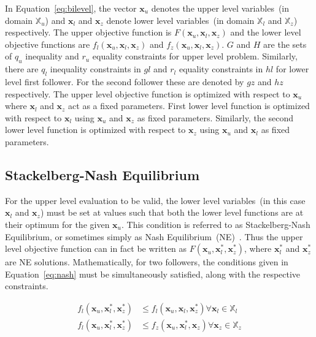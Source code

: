 In Equation~\ref{eq:bilevel}, the vector $\mathbf{x}_u$ denotes the upper level variables~(in domain
$\mathbb{X}_u$) and $\mathbf{x}_l$ and $\mathbf{x}_z$ denote lower level variables~(in domain
$\mathbb{X}_l$ and $\mathbb{X}_z$) respectively. The upper objective function is $F(\mathbf{x}_u, \mathbf{ x}_l, \mathbf{ x}_z)$ and the lower level objective functions are $f_l(\mathbf{x}_u, \mathbf{ x}_l, \mathbf{ x}_z)$ and
$f_z(\mathbf{x}_u, \mathbf{ x}_l, \mathbf{ x}_z)$. $G$ and $H$ are the sets of $q_u$ inequality and $r_u$ equality
constraints for upper level problem. Similarly, there are $q_l$ inequality constraints in $gl$ and
$r_l$ equality constraints in $hl$ for lower level first follower. For the second follower these are
denoted by $gz$ and $hz$ respectively. The upper level objective function is optimized with respect
to $\mathbf{x}_u$ where $\mathbf{x}_l$ and $\mathbf{x}_z$ act as a fixed parameters. First
lower level function is optimized with respect to $\mathbf{x}_l$ using $\mathbf{x}_u$ and
$\mathbf{x}_z$ as fixed parameters. Similarly, the second lower level function is optimized with
respect to $\mathbf{x}_z$ using $\mathbf{x}_u$ and $\mathbf{x}_l$ as fixed parameters.

\subsection*{Stackelberg-Nash Equilibrium}

For the upper level evaluation to be valid, the lower level variables~(in this case $\mathbf{x}_l$
and $\mathbf{x}_z$) must be set at values such that both the lower level functions are at their
optimum for the given $\mathbf{x}_u$. This condition is referred to as Stackelberg-Nash Equilibrium,
or sometimes simply as Nash Equilibrium~(NE)~\cite{nash1951non,angelo2015}. Thus the upper level
objective function can in fact be written as $F(\mathbf{x}_u, \mathbf{ x}^*_l, \mathbf{ x}^*_z)$, where $\mathbf{x}^*_l$
and $\mathbf{x}_z^*$ are NE solutions. Mathematically, for two followers, the conditions given in
Equation~\ref{eq:nash} must be simultaneously satisfied, along with the respective constraints.

\begin{equation} \begin{aligned} f_l(\mathbf{x}_u, \mathbf{ x}^*_l, \mathbf{ x}^*_z) & \leq f_l(\mathbf{x}_u, \mathbf{ x}_l, \mathbf{ x}^*_z) \forall \mathbf{x}_l\in \mathbb{X}_l\\ f_l(\mathbf{x}_u, \mathbf{ x}^*_l, \mathbf{ x}^*_z) & \leq
f_z(\mathbf{x}_u, \mathbf{ x}^*_l, \mathbf{ x}_z) \forall \mathbf{x}_z\in \mathbb{X}_z\\ \end{aligned} \label{eq:nash}
\end{equation}

